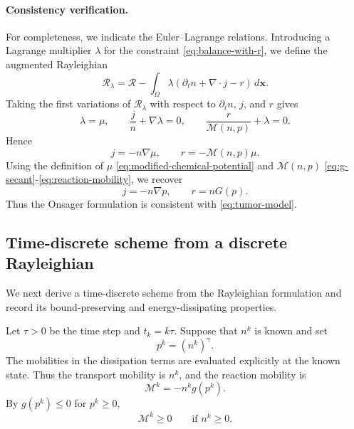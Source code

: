 \documentclass[11pt]{article}
\theoremstyle{plain}
\numberwithin{equation}{section}
\begin{document}
\paragraph{Consistency verification.}
For completeness, we indicate the Euler--Lagrange relations. Introducing a
Lagrange multiplier \(\lambda\) for the constraint
\eqref{eq:balance-with-r}, we define the augmented Rayleighian
\[
    \mathcal R_\lambda
    =
    \mathcal R
    -
    \int_\Omega
    \lambda\left(\partial_t n+\nabla\cdot j-r\right)\,d\mathbf{x} .
\]
Taking the first variations of \(\mathcal R_\lambda\) with respect to
\(\partial_t n\), \(j\), and \(r\) gives
\[
    \lambda=\mu,
    \qquad
    \frac{j}{n}+\nabla\lambda=0,
    \qquad
    \frac{r}{\mathcal M(n,p)}+\lambda=0 .
\]
Hence
\begin{equation}\label{eq:onsager-el-relations}
    j=-n\nabla\mu,
    \qquad
    r=-\mathcal M(n,p)\mu .
\end{equation}
Using the definition of $\mu$ \eqref{eq:modified-chemical-potential} and \(\mathcal M(n,p)\) \eqref{eq:g-secant}-\eqref{eq:reaction-mobility}, we recover
\[
    j=-n\nabla p,
    \qquad
    r=nG(p).
\]
Thus the Onsager formulation is consistent with \eqref{eq:tumor-model}.








\subsection{Time-discrete scheme from a discrete Rayleighian}
\label{subsec:time-discrete}

We next derive a time-discrete scheme from the Rayleighian formulation and
record its bound-preserving and energy-dissipating properties.

Let \(\tau>0\) be the time step and \(t_k=k\tau\). Suppose that \(n^k\) is
known and set
\[
    p^k=(n^k)^\gamma .
\]
The mobilities in the dissipation terms are evaluated explicitly at the
known state. Thus the transport mobility is \(n^k\), and the reaction
mobility is
\begin{equation}\label{eq:discrete-reaction-mobility}
    \mathcal M^k
    =
    -n^k g(p^k).
\end{equation}
By \(g(p^k)\le0\) for \(p^k\ge0\),
\begin{equation} \label{prop:M}
    \mathcal M^k\ge0
    \qquad \text{if } n^k\ge0 .
\end{equation}
\end{document}
